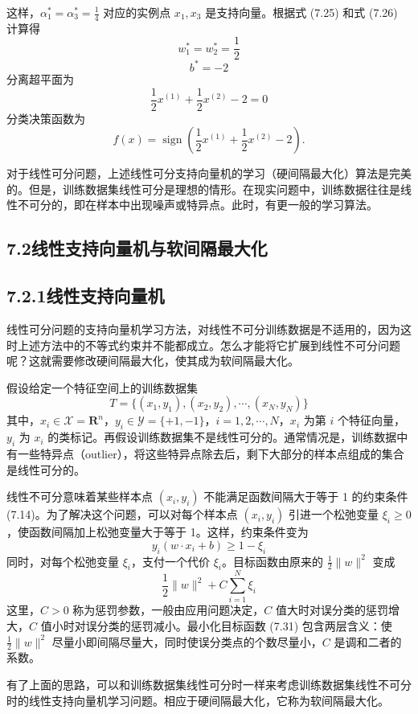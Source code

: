 \documentclass[UTF8, 12pt, fontset=fandol, oneside]{ctexart}
\begin{document}
这样，$\alpha_1^*=\alpha_3^*=\frac{1}{4}$ 对应的实例点 $x_1,x_3$ 是支持向量。根据式 (7.25) 和式 (7.26) 计算得
\[
w_1^*=w_2^*=\frac{1}{2}
\]
\[
b^*=-2
\]
分离超平面为
\[
\frac{1}{2}x^{(1)}+\frac{1}{2}x^{(2)}-2=0
\]
分类决策函数为
\[
f(x)=\operatorname{sign}\left(\frac{1}{2}x^{(1)}+\frac{1}{2}x^{(2)}-2\right).
\]

对于线性可分问题，上述线性可分支持向量机的学习（硬间隔最大化）算法是完美的。但是，训练数据集线性可分是理想的情形。在现实问题中，训练数据往往是线性不可分的，即在样本中出现噪声或特异点。此时，有更一般的学习算法。

\subsection*{7.2\quad 线性支持向量机与软间隔最大化}

\subsection*{7.2.1\quad 线性支持向量机}

线性可分问题的支持向量机学习方法，对线性不可分训练数据是不适用的，因为这时上述方法中的不等式约束并不能都成立。怎么才能将它扩展到线性不可分问题呢？这就需要修改硬间隔最大化，使其成为软间隔最大化。

假设给定一个特征空间上的训练数据集
\[
T=\{(x_1,y_1),(x_2,y_2),\cdots,(x_N,y_N)\}
\]
其中，$x_i\in\mathcal{X}=\mathbf{R}^n$，$y_i\in\mathcal{Y}=\{+1,-1\}$，$i=1,2,\cdots,N$，$x_i$ 为第 $i$ 个特征向量，$y_i$ 为 $x_i$ 的类标记。再假设训练数据集不是线性可分的。通常情况是，训练数据中有一些特异点（outlier），将这些特异点除去后，剩下大部分的样本点组成的集合是线性可分的。

线性不可分意味着某些样本点 $(x_i,y_i)$ 不能满足函数间隔大于等于 1 的约束条件 (7.14)。为了解决这个问题，可以对每个样本点 $(x_i,y_i)$ 引进一个松弛变量 $\xi_i\geq 0$，使函数间隔加上松弛变量大于等于 1。这样，约束条件变为
\[
y_i(w\cdot x_i+b)\geq 1-\xi_i
\]
同时，对每个松弛变量 $\xi_i$，支付一个代价 $\xi_i$。目标函数由原来的 $\frac{1}{2}\|w\|^2$ 变成
\begin{equation}
\frac{1}{2}\|w\|^2+C\sum_{i=1}^N\xi_i
\tag{7.31}
\end{equation}
这里，$C>0$ 称为惩罚参数，一般由应用问题决定，$C$ 值大时对误分类的惩罚增大，$C$ 值小时对误分类的惩罚减小。最小化目标函数 (7.31) 包含两层含义：使 $\frac{1}{2}\|w\|^2$ 尽量小即间隔尽量大，同时使误分类点的个数尽量小，$C$ 是调和二者的系数。

有了上面的思路，可以和训练数据集线性可分时一样来考虑训练数据集线性不可分时的线性支持向量机学习问题。相应于硬间隔最大化，它称为软间隔最大化。
\end{document}
